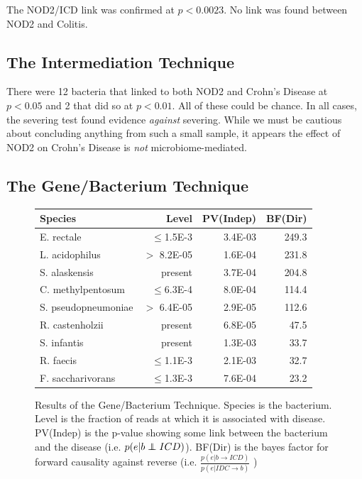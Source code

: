 \documentclass[a4paper]{article}
\newcommand\independent{\protect\mathpalette{\protect\independenT}{\perp}}
\def\independenT#1#2{\mathrel{\rlap{$#1#2$}\mkern2mu{#1#2}}}
\begin{document}
The NOD2/ICD link was confirmed at
$p<0.0023$.  No link was found between NOD2 and Colitis.

\subsection{The Intermediation Technique}

There were 12 bacteria that linked to both NOD2 and Crohn's Disease at
$p<0.05$ and 2 that did so at $p<0.01$.  All of these could be
chance. In all cases, the severing
test found evidence \textit{against} severing.  While we must be
cautious about concluding anything from such a small sample, it
appears the effect of NOD2 on Crohn's Disease is \textit{not}
microbiome-mediated.

\subsection{The Gene/Bacterium Technique}

\begin{figure}[b]
  \begin{tabular}{@{}lrrr}
    Species & Level & PV(Indep) & BF(Dir) \\
\hline
E. rectale & $\leq$1.5E-3 & 3.4E-03 & 249.3\\
L. acidophilus & $>$ 8.2E-05 & 1.6E-04 & 231.8\\
S. alaskensis & present & 3.7E-04 & 204.8\\
C. methylpentosum & $\leq$6.3E-4 & 8.0E-04 & 114.4\\
S. pseudopneumoniae & $>$ 6.4E-05 & 2.9E-05 & 112.6\\
R. castenholzii & present & 6.8E-05 & 47.5\\
S. infantis & present & 1.3E-03 & 33.7\\
R. faecis & $\leq$1.1E-3 & 2.1E-03 & 32.7\\
F. saccharivorans & $\leq$1.3E-3 & 7.6E-04 & 23.2 \\
  \end{tabular}
  \caption{ Results of the Gene/Bacterium Technique.  Species is the
    bacterium.  Level is the fraction of reads at which it is
    associated with disease.  PV(Indep) is the p-value showing some link
    between the bacterium and the disease (i.e. $p(e|b\independent
    ICD)$).  BF(Dir) is the bayes factor for forward causality against
    reverse (i.e. 
    $\frac{p(e|b\rightarrow ICD)}{p(e|IDC\rightarrow b)}$ ) } 
\end{figure}
\end{document}
